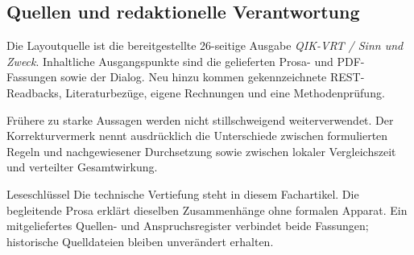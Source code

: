 \begin{cols}
\subsection*{Quellen und redaktionelle Verantwortung}
Die Layoutquelle ist die bereitgestellte 26-seitige Ausgabe \emph{QIK-VRT / Sinn und Zweck}. Inhaltliche Ausgangspunkte sind die gelieferten Prosa- und PDF-Fassungen sowie der Dialog. Neu hinzu kommen gekennzeichnete REST-Readbacks, Literaturbezüge, eigene Rechnungen und eine Methodenprüfung. 

Frühere zu starke Aussagen werden nicht stillschweigend weiterverwendet. Der Korrekturvermerk nennt ausdrücklich die Unterschiede zwischen formulierten Regeln und nachgewiesener Durchsetzung sowie zwischen lokaler Vergleichszeit und verteilter Gesamtwirkung.

\begin{boundary}{Leseschlüssel}
Die technische Vertiefung steht in diesem Fachartikel. Die begleitende Prosa erklärt dieselben Zusammenhänge ohne formalen Apparat. Ein mitgeliefertes Quellen- und Anspruchsregister verbindet beide Fassungen; historische Quelldateien bleiben unverändert erhalten.
\end{boundary}
\end{cols}
